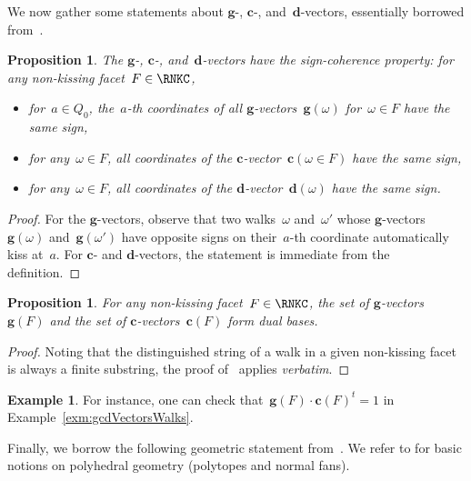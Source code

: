 \documentclass{amsart}
\newtheorem{proposition}[theorem]{Proposition}
\theoremstyle{definition}
\newtheorem{example}[theorem]{Example}
\renewcommand{\b}[1]{\mathbf{#1}} %
\newcommand{\transpose}[1]{{#1}^t} %
\newcommand{\darkblue}{\color{darkblue}} %
\newcommand{\defn}[1]{\textsl{\darkblue #1}} %
\newcommand{\dvector}[1]{\mathbf{d}(#1)} %
\newcommand{\gvector}[1]{\mathbf{g}(#1)} %
\newcommand{\gvectors}[1]{\mathbf{g}(#1)} %
\newcommand{\cvector}[2]{\mathbf{c}(#1 \in #2)} %
\newcommand{\cvectors}[1]{\mathbf{c}(#1)} %
\begin{document}
We now gather some statements about $\b{g}$-, $\b{c}$-, and~$\b{d}$-vectors, essentially borrowed from~\cite[Part.~4]{PaluPilaudPlamondon}.

\begin{proposition}
\label{rem:signCoherence}
The $\b{g}$-, $\b{c}$-, and~$\b{d}$-vectors have the \defn{sign-coherence property}: for any non-kissing facet~$F \in \RNKC$,
\begin{itemize}
\item for~$a \in Q_0$, the~$a$-th coordinates of all $\b{g}$-vectors~$\gvector{\omega}$ for~$\omega \in F$ have the same sign,
\item for any~$\omega \in F$, all coordinates of the $\b{c}$-vector~$\cvector{\omega}{F}$ have the same sign,
\item for any~$\omega \in F$, all coordinates of the $\b{d}$-vector~$\dvector{\omega}$ have the same sign.
\end{itemize}
\end{proposition}

\begin{proof}
For the $\b{g}$-vectors, observe that two walks~$\omega$ and~$\omega'$ whose $\b{g}$-vectors~$\gvector{\omega}$ and~$\gvector{\omega'}$ have opposite signs on their~$a$-th coordinate automatically kiss at~$a$.
For $\b{c}$- and $\b{d}$-vectors, the statement is immediate from the definition.
\end{proof}

\begin{proposition}
\label{prop:gvectorscvectorsDualBases}
For any non-kissing facet~$F \in \RNKC$, the set of $\b{g}$-vectors~$\gvectors{F}$ and the set of $\b{c}$-vectors~$\cvectors{F}$ form dual bases. 
\end{proposition}

\begin{proof}
Noting that the distinguished string of a walk in a given non-kissing facet is always a finite substring, the proof of~\cite[Proposition 4.16]{PaluPilaudPlamondon} applies \emph{verbatim}.
\end{proof}

\begin{example}
For instance, one can check that~$\gvectors{F} \cdot \transpose{\cvectors{F}} = 1$ in Example~\ref{exm:gcdVectorsWalks}.
\end{example}

Finally, we borrow the following geometric statement from~\cite{PaluPilaudPlamondon}.
We refer to \cite{Ziegler-polytopes} for basic notions on polyhedral geometry (polytopes and normal fans).
\end{document}
